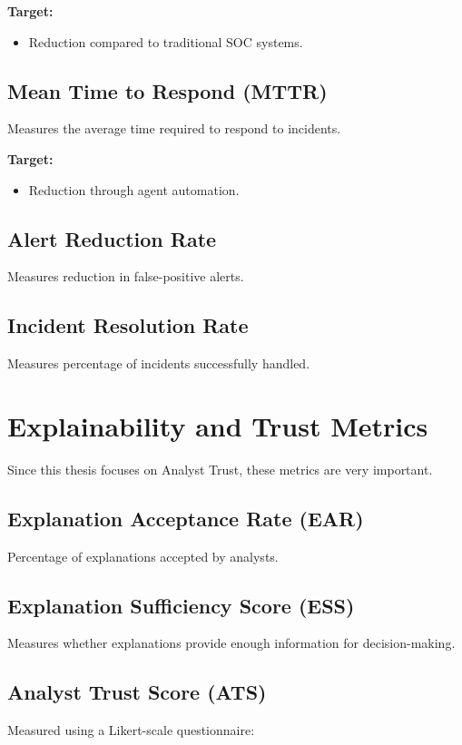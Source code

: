 \documentclass[12pt,a4paper]{report}
\begin{document}
\textbf{Target:}
\begin{itemize}
    \item Reduction compared to traditional SOC systems.
\end{itemize}

\subsection{Mean Time to Respond (MTTR)}
Measures the average time required to respond to incidents.

\textbf{Target:}
\begin{itemize}
    \item Reduction through agent automation.
\end{itemize}

\subsection{Alert Reduction Rate}
Measures reduction in false-positive alerts.

\subsection{Incident Resolution Rate}
Measures percentage of incidents successfully handled.

\section{Explainability and Trust Metrics}
\label{sec:trust_metrics}

Since this thesis focuses on Analyst Trust, these metrics are very important.

\subsection{Explanation Acceptance Rate (EAR)}
Percentage of explanations accepted by analysts.

\subsection{Explanation Sufficiency Score (ESS)}
Measures whether explanations provide enough information for decision-making.

\subsection{Analyst Trust Score (ATS)}
Measured using a Likert-scale questionnaire:
\end{document}
